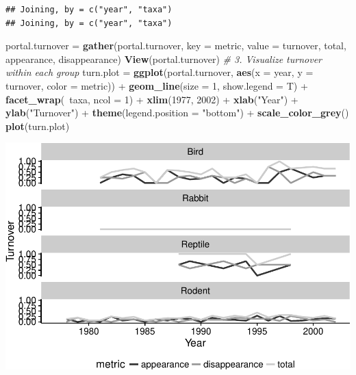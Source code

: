 \documentclass[]{article}
\newenvironment{Shaded}{\begin{snugshade}}{\end{snugshade}}
\newcommand{\KeywordTok}[1]{\textcolor[rgb]{0.13,0.29,0.53}{\textbf{{#1}}}}
\newcommand{\DataTypeTok}[1]{\textcolor[rgb]{0.13,0.29,0.53}{{#1}}}
\newcommand{\DecValTok}[1]{\textcolor[rgb]{0.00,0.00,0.81}{{#1}}}
\newcommand{\StringTok}[1]{\textcolor[rgb]{0.31,0.60,0.02}{{#1}}}
\newcommand{\CommentTok}[1]{\textcolor[rgb]{0.56,0.35,0.01}{\textit{{#1}}}}
\newcommand{\NormalTok}[1]{{#1}}
\begin{document}
\begin{verbatim}
## Joining, by = c("year", "taxa")
## Joining, by = c("year", "taxa")
\end{verbatim}

\begin{Shaded}
\begin{Highlighting}[]
\NormalTok{portal.turnover =}\StringTok{ }\KeywordTok{gather}\NormalTok{(portal.turnover, }\DataTypeTok{key =} \NormalTok{metric, }\DataTypeTok{value =} \NormalTok{turnover, total, appearance, disappearance)}
\KeywordTok{View}\NormalTok{(portal.turnover)}
\CommentTok{# 3. Visualize turnover within each group}
\NormalTok{turn.plot =}\StringTok{ }\KeywordTok{ggplot}\NormalTok{(portal.turnover, }\KeywordTok{aes}\NormalTok{(}\DataTypeTok{x =} \NormalTok{year, }\DataTypeTok{y =} \NormalTok{turnover, }\DataTypeTok{color =} \NormalTok{metric)) +}
\StringTok{  }\KeywordTok{geom_line}\NormalTok{(}\DataTypeTok{size =} \DecValTok{1}\NormalTok{, }\DataTypeTok{show.legend =} \NormalTok{T) +}\StringTok{ }\KeywordTok{facet_wrap}\NormalTok{(~taxa, }\DataTypeTok{ncol =} \DecValTok{1}\NormalTok{) +}
\StringTok{  }\KeywordTok{xlim}\NormalTok{(}\DecValTok{1977}\NormalTok{, }\DecValTok{2002}\NormalTok{) +}
\StringTok{  }\KeywordTok{xlab}\NormalTok{(}\StringTok{"Year"}\NormalTok{) +}
\StringTok{  }\KeywordTok{ylab}\NormalTok{(}\StringTok{"Turnover"}\NormalTok{) +}
\StringTok{  }\KeywordTok{theme}\NormalTok{(}\DataTypeTok{legend.position =} \StringTok{"bottom"}\NormalTok{) +}
\StringTok{  }\KeywordTok{scale_color_grey}\NormalTok{()}
\KeywordTok{plot}\NormalTok{(turn.plot)}
\end{Highlighting}
\end{Shaded}

\includegraphics{temporal_assignment_files/figure-latex/unnamed-chunk-6-1.pdf}
\end{document}
